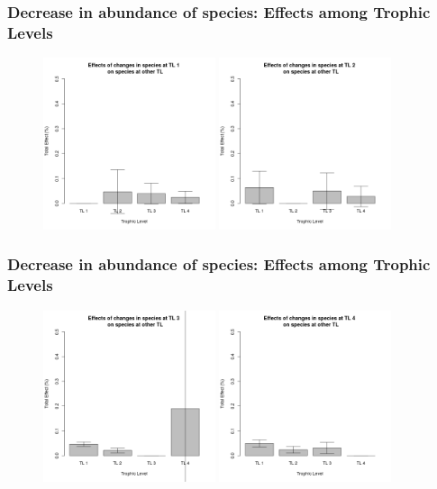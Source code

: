 \documentclass[xcolor=x11names,compress]{beamer}
\renewcommand{\(}{\begin{columns}}
\renewcommand{\)}{\end{columns}}
\newcommand{\<}[1]{\begin{column}{#1}}
\renewcommand{\>}{\end{column}}
\begin{document}
\begin{frame}
\frametitle{Decrease in abundance of species: Effects among Trophic Levels}
\begin{figure}
 \includegraphics[width=0.45\textwidth]{./figures/antfigures/Effects_of_TL1} 
 \includegraphics[width=0.45\textwidth]{./figures/antfigures/Effects_of_TL2} 
\end{figure}
\end{frame}

\begin{frame}
\frametitle{Decrease in abundance of species: Effects among Trophic Levels}
\begin{figure}
 \includegraphics[width=0.45\textwidth]{./figures/antfigures/Effects_of_TL3} 
 \includegraphics[width=0.45\textwidth]{./figures/antfigures/Effects_of_TL4} 
\end{figure}
\end{frame}
\end{document}
